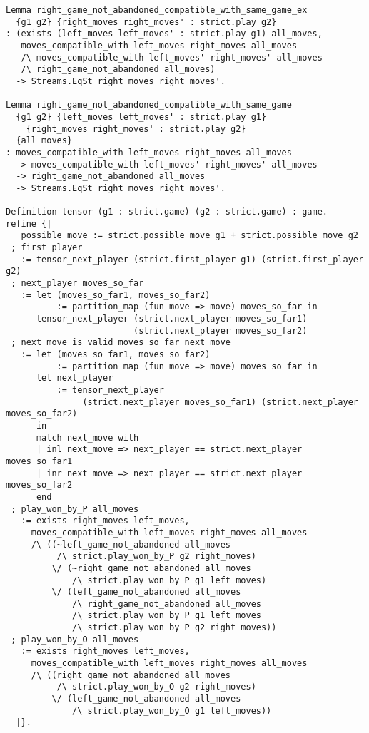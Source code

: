\documentclass{article}
\theoremstyle{definition}
\begin{document}
\begin{verbatim}
Lemma right_game_not_abandoned_compatible_with_same_game_ex
  {g1 g2} {right_moves right_moves' : strict.play g2}
: (exists (left_moves left_moves' : strict.play g1) all_moves,
   moves_compatible_with left_moves right_moves all_moves
   /\ moves_compatible_with left_moves' right_moves' all_moves
   /\ right_game_not_abandoned all_moves)
  -> Streams.EqSt right_moves right_moves'.
  
Lemma right_game_not_abandoned_compatible_with_same_game
  {g1 g2} {left_moves left_moves' : strict.play g1} 
    {right_moves right_moves' : strict.play g2}
  {all_moves}
: moves_compatible_with left_moves right_moves all_moves
  -> moves_compatible_with left_moves' right_moves' all_moves
  -> right_game_not_abandoned all_moves
  -> Streams.EqSt right_moves right_moves'.
  
Definition tensor (g1 : strict.game) (g2 : strict.game) : game.
refine {|
   possible_move := strict.possible_move g1 + strict.possible_move g2
 ; first_player
   := tensor_next_player (strict.first_player g1) (strict.first_player g2)
 ; next_player moves_so_far
   := let (moves_so_far1, moves_so_far2)
          := partition_map (fun move => move) moves_so_far in
      tensor_next_player (strict.next_player moves_so_far1)
                         (strict.next_player moves_so_far2)
 ; next_move_is_valid moves_so_far next_move
   := let (moves_so_far1, moves_so_far2)
          := partition_map (fun move => move) moves_so_far in
      let next_player
          := tensor_next_player
               (strict.next_player moves_so_far1) (strict.next_player moves_so_far2)
      in
      match next_move with
      | inl next_move => next_player == strict.next_player moves_so_far1
      | inr next_move => next_player == strict.next_player moves_so_far2
      end
 ; play_won_by_P all_moves
   := exists right_moves left_moves,
     moves_compatible_with left_moves right_moves all_moves
     /\ ((~left_game_not_abandoned all_moves
          /\ strict.play_won_by_P g2 right_moves)
         \/ (~right_game_not_abandoned all_moves
             /\ strict.play_won_by_P g1 left_moves)
         \/ (left_game_not_abandoned all_moves
             /\ right_game_not_abandoned all_moves
             /\ strict.play_won_by_P g1 left_moves
             /\ strict.play_won_by_P g2 right_moves))
 ; play_won_by_O all_moves
   := exists right_moves left_moves,
     moves_compatible_with left_moves right_moves all_moves
     /\ ((right_game_not_abandoned all_moves
          /\ strict.play_won_by_O g2 right_moves)
         \/ (left_game_not_abandoned all_moves
             /\ strict.play_won_by_O g1 left_moves))
  |}.
\end{verbatim}
\end{document}
